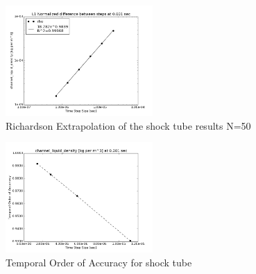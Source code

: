     \begin{figure}[!h]
    	\centering
    	\includegraphics[width=0.5\textwidth]{images/Shock_Tube/Difference_rho}
    	\caption{Richardson Extrapolation of the shock tube results N=50}
    	\label{fig:ST_Err_rho}
    \end{figure}
    
    \begin{figure}[!h]
    	\centering
    	\includegraphics[width=0.50\textwidth]{images/Shock_Tube/Temporal_Order_Of_Accuracy_rho}
    	\caption{Temporal Order of Accuracy for shock tube}
    	\label{fig:ST_OOA_rho}
    \end{figure}
	
	
